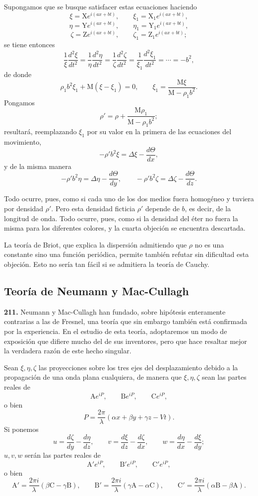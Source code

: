 Supongamos que se busque satisfacer estas ecuaciones haciendo
\[
\xi=\mathrm{X}e^{i(ax+bt)},\qquad \xi_1=\mathrm{X}_1e^{i(ax+bt)},
\]
\[
\eta=\mathrm{Y}e^{i(ax+bt)},\qquad \eta_1=\mathrm{Y}_1e^{i(ax+bt)},
\]
\[
\zeta=\mathrm{Z}e^{i(ax+bt)},\qquad \zeta_1=\mathrm{Z}_1e^{i(ax+bt)};
\]
se tiene entonces
\[
\frac{1}{\xi}\frac{d^2\xi}{dt^2}=\frac{1}{\eta}\frac{d^2\eta}{dt^2}
=\frac{1}{\zeta}\frac{d^2\zeta}{dt^2}=\frac{1}{\xi_1}\frac{d^2\xi_1}{dt^2}
=\cdots=-b^2,
\]
de donde
\[
\rho_1b^2\xi_1+\mathrm{M}(\xi-\xi_1)=0,\qquad \xi_1=\frac{\mathrm{M}\xi}{\mathrm{M}-\rho_1b^2}.
\]
Pongamos
\[
\rho'=\rho+\frac{\mathrm{M}\rho_1}{\mathrm{M}-\rho_1b^2};
\]
resultará, reemplazando $\xi_1$ por su valor en la primera de las
ecuaciones del movimiento,
\[
-\rho'b^2\xi=\Delta\xi-\frac{d\Theta}{dx},
\]
y de la misma manera
\[
-\rho'b^2\eta=\Delta\eta-\frac{d\Theta}{dy},\qquad
-\rho'b^2\zeta=\Delta\zeta-\frac{d\Theta}{dz}.
\]

Todo ocurre, pues, como si cada uno de los dos medios fuera homogéneo y
tuviera por densidad $\rho'$. Pero esta densidad ficticia $\rho'$ depende
de $b$, es decir, de la longitud de onda. Todo ocurre, pues, como si la
densidad del éter no fuera la misma para los diferentes colores, y la
cuarta objeción se encuentra descartada.

La teoría de Briot, que explica la dispersión admitiendo que $\rho$ no es
una constante sino una función periódica, permite también refutar sin
dificultad esta objeción. Esto no sería tan fácil si se admitiera la
teoría de Cauchy.

\subsection{Teoría de Neumann y Mac-Cullagh}
\label{sec:reflexion-neumann}

\noindent\textbf{211.} Neumann y Mac-Cullagh han
fundado, sobre hipótesis enteramente contrarias a las de Fresnel, una
teoría que sin embargo también está confirmada por la experiencia. En el
estudio de esta teoría, adoptaremos un modo de exposición que difiere
mucho del de sus inventores, pero que hace resaltar mejor la verdadera
razón de este hecho singular.

Sean $\xi,\eta,\zeta$ las proyecciones sobre los tres ejes del
desplazamiento debido a la propagación de una onda plana cualquiera, de
manera que $\xi,\eta,\zeta$ sean las partes reales de
\[
\mathrm{A}e^{iP},\qquad \mathrm{B}e^{iP},\qquad \mathrm{C}e^{iP},
\]
o bien
\[
P=\frac{2\pi}{\lambda}(\alpha x+\beta y+\gamma z-Vt).
\]
Si ponemos
\[
u=\frac{d\zeta}{dy}-\frac{d\eta}{dz},\qquad v=\frac{d\xi}{dz}-\frac{d\zeta}{dx},
\qquad w=\frac{d\eta}{dx}-\frac{d\xi}{dy};
\]
$u,v,w$ serán las partes reales de
\[
\mathrm{A}'e^{iP},\qquad \mathrm{B}'e^{iP},\qquad \mathrm{C}'e^{iP},
\]
o bien
\[
\mathrm{A}'=\frac{2\pi i}{\lambda}(\beta\mathrm{C}-\gamma\mathrm{B}),\qquad
\mathrm{B}'=\frac{2\pi i}{\lambda}(\gamma\mathrm{A}-\alpha\mathrm{C}),\qquad
\mathrm{C}'=\frac{2\pi i}{\lambda}(\alpha\mathrm{B}-\beta\mathrm{A}).
\]


